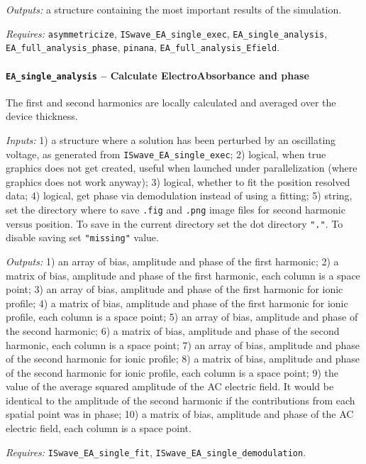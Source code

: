 \textit{Outputs:} a structure containing the most important results of the simulation.

\textit{Requires:} \texttt{asymmetricize}, \texttt{IS\-wave\_EA\_single\_exec},
\texttt{EA\_single\_analysis}, \texttt{EA\_full\_analysis\_phase}, \texttt{pinana}, \texttt{EA\_full\_analysis\_Efield}.


\paragraph{\texttt{EA\_single\_analysis} -- Calculate ElectroAbsorbance and phase}
The first and second harmonics are locally calculated and averaged over the device thickness.

\textit{Inputs:} 1) a structure where a solution has been perturbed by an
oscillating voltage, as generated from \texttt{IS\-wave\_EA\_single\_exec};
2) logical, when true graphics does not get created, useful when
launched under parallelization (where graphics does not work anyway);
3) logical, whether to fit the position resolved data;
4) logical, get phase via demodulation instead of using a fitting;
5) string, set the directory where to save \texttt{.fig} and \texttt{.png}
image files for second harmonic versus position.
To save in the current directory set the dot directory \texttt{"."}.
To disable saving set \texttt{"missing"} value.

\textit{Outputs:} 1) an array of bias, amplitude and phase of the first
harmonic;
2) a matrix of bias, amplitude and phase of the first
harmonic, each column is a space point;
3) an array of bias, amplitude and phase of the first
harmonic for ionic profile;
4) a matrix of bias, amplitude and phase of the first
harmonic for ionic profile, each column is a space point;
5) an array of bias, amplitude and phase of the second
harmonic;
6) a matrix of bias, amplitude and phase of the second
harmonic, each column is a space point;
7) an array of bias, amplitude and phase of the second
harmonic for ionic profile;
8) a matrix of bias, amplitude and phase of the second
harmonic for ionic profile, each column is a space point;
9) the value of the average squared amplitude of the
AC electric field. It would be identical to the amplitude of the
second harmonic if the contributions from each spatial point was in
phase;
10) a matrix of bias, amplitude and phase of the AC electric
field, each column is a space point.

\textit{Requires:} \texttt{IS\-wave\_EA\_single\_fit}, \texttt{IS\-wave\_EA\_single\_demodulation}.

